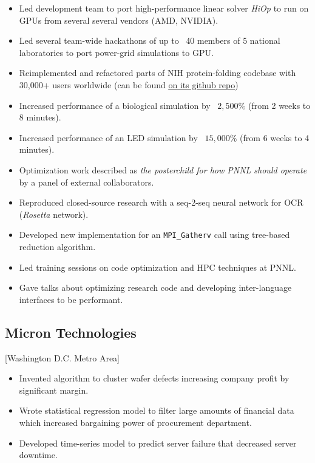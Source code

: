 \documentclass{mycv}
\begin{document}
\begin{itemize}
  \item Led development team to port high-performance linear solver \textit{HiOp} to run on GPUs from several several vendors (AMD, NVIDIA).
  \item Led several team-wide hackathons of up to ~40 members of 5 national laboratories to port power-grid simulations to GPU.
  \item Reimplemented and refactored parts of NIH protein-folding codebase with 30,000+ users worldwide (can be found \href{https://github.com/Electrostatics/apbs}{\underline{on its github repo}})
  \item Increased performance of a biological simulation by ~$2,500\%$ (from 2 weeks to 8 minutes).
  \item Increased performance of an LED simulation by ~$15,000\%$ (from 6 weeks to 4 minutes).
  \item Optimization work described as \textit{the posterchild for how PNNL should operate} by a panel of external collaborators.
  \item Reproduced closed-source research with a seq-2-seq neural network for OCR (\textit{Rosetta} network).
  \item Developed new implementation for an \verb|MPI_Gatherv| call using tree-based reduction algorithm.
  \item Led training sessions on code optimization and HPC techniques at PNNL.
  \item Gave talks about optimizing research code and developing inter-language interfaces to be performant.
\end{itemize}

\subsection{Micron Technologies}[Washington D.C. Metro Area]
\begin{positions}
\end{positions}

\begin{itemize}
  \item Invented algorithm to cluster wafer defects increasing company profit by significant margin.
  \item Wrote statistical regression model to filter large amounts of financial data which increased bargaining power of procurement department.
  \item Developed time-series model to predict server failure that decreased server downtime.
\end{itemize}
\end{document}
